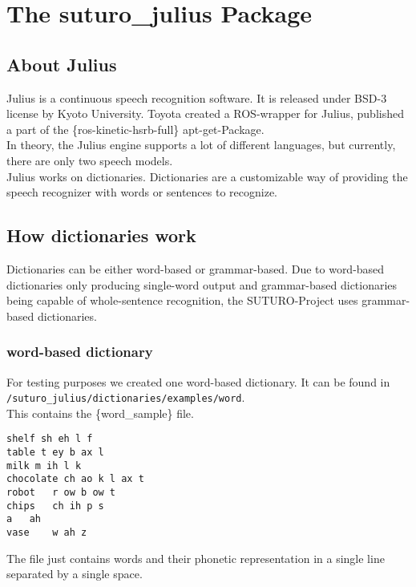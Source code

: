 \documentclass[main.tex]{subfiles}
\begin{document}
\newpage
\section{The suturo\_julius Package}

    \subsection{About Julius}
      Julius is a continuous speech recognition software. It is released under BSD-3 license by Kyoto University. Toyota created a ROS-wrapper for Julius, published a part of the \{ros-kinetic-hsrb-full\} apt-get-Package.\\
      In theory, the Julius engine supports a lot of different languages, but currently, there are only two speech models.\\
      Julius works on dictionaries. Dictionaries are a customizable way of providing the speech recognizer with words or sentences to recognize.
    \subsection{How dictionaries work}
      Dictionaries can be either word-based or grammar-based. Due to word-based dictionaries only producing single-word output and grammar-based dictionaries being capable of whole-sentence recognition, the SUTURO-Project uses grammar-based dictionaries.
    
        \subsubsection{word-based dictionary}
            For testing purposes we created one word-based dictionary. It can be found in \lstinline[language=TeX]|/suturo_julius/dictionaries/examples/word|.\\
            This contains the \{word\_sample\} file.\\
            \begin{lstlisting}
shelf sh eh l f
table t ey b ax l
milk m ih l k
chocolate ch ao k l ax t
robot	r ow b ow t
chips	ch ih p s
a	ah
vase	w ah z
            \end{lstlisting}
            The file just contains words and their phonetic representation in a single line separated by a single space.
            
\end{document}
